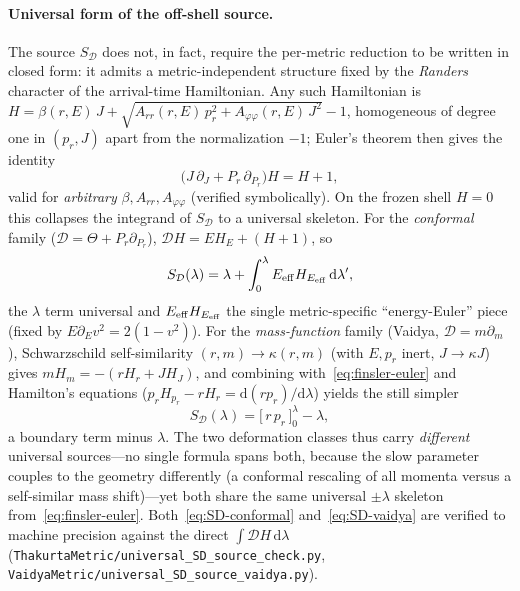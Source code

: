 \documentclass[12pt]{iopart}
\newcommand{\dd}{\mathrm{d}}
\begin{document}
\paragraph{Universal form of the off-shell source.} The source $S_{\mathcal D}$ does
not, in fact, require the per-metric reduction to be written in closed form: it admits
a metric-independent structure fixed by the \emph{Randers} character of the
arrival-time Hamiltonian. Any such Hamiltonian is
$H=\beta(r,E)\,J+\sqrt{A_{rr}(r,E)\,p_r^2+A_{\varphi\varphi}(r,E)\,J^2}-1$, homogeneous
of degree one in $(p_r,J)$ apart from the normalization $-1$; Euler's theorem then
gives the identity
\begin{equation}
    \big(J\,\partial_J+P_r\,\partial_{P_r}\big)H=H+1,
    \label{eq:finsler-euler}
\end{equation}
valid for \emph{arbitrary} $\beta,A_{rr},A_{\varphi\varphi}$ (verified symbolically).
On the frozen shell $H=0$ this collapses the integrand of $S_{\mathcal D}$ to a
universal skeleton. For the \emph{conformal} family ($\mathcal D=\Theta+P_r\partial_{P_r}$),
$\mathcal D H=E H_E+(H+1)$, so
\begin{equation}
    S_{\mathcal D}(\lambda)=\lambda+\int_0^{\lambda}E_{\rm eff}H_{E_{\rm eff}}\,\dd\lambda',
    \label{eq:SD-conformal}
\end{equation}
the $\lambda$ term universal and $E_{\rm eff}H_{E_{\rm eff}}$ the single
metric-specific ``energy-Euler'' piece (fixed by $E\partial_E v^2=2(1-v^2)$). For the
\emph{mass-function} family (Vaidya, $\mathcal D=m\partial_m$), Schwarzschild
self-similarity $(r,m)\to\kappa(r,m)$ (with $E,p_r$ inert, $J\to\kappa J$) gives
$m H_m=-(rH_r+JH_J)$, and combining with~\eqref{eq:finsler-euler} and Hamilton's
equations ($p_rH_{p_r}-rH_r=\dd(rp_r)/\dd\lambda$) yields the still simpler
\begin{equation}
    S_{\mathcal D}(\lambda)=\big[\,r\,p_r\,\big]_0^{\lambda}-\lambda,
    \label{eq:SD-vaidya}
\end{equation}
a boundary term minus $\lambda$. The two deformation classes thus carry
\emph{different} universal sources---no single formula spans both, because the slow
parameter couples to the geometry differently (a conformal rescaling of all momenta
versus a self-similar mass shift)---yet both share the same universal $\pm\lambda$
skeleton from~\eqref{eq:finsler-euler}. Both~\eqref{eq:SD-conformal}
and~\eqref{eq:SD-vaidya} are verified to machine precision against the direct
$\int\mathcal D H\,\dd\lambda$ (\texttt{ThakurtaMetric/universal\_SD\_source\_check.py},
\texttt{VaidyaMetric/universal\_SD\_source\_vaidya.py}).
\end{document}
